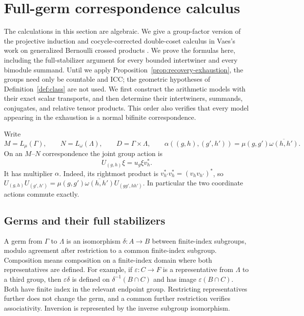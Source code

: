 \section{Full-germ correspondence calculus}\label{sec:calculus}

The calculations in this section are algebraic.  We give a group-factor
version of the projective induction and cocycle-corrected double-coset
calculus in Vaes's work on generalized Bernoulli crossed products
\cite[Theorem~2.2 and Section~6.2, especially Definition~6.8 and
Theorem~6.9]{Vaes2008}.  We prove the formulas here, including the
full-stabilizer argument for every bounded intertwiner and every bimodule
summand.  Until we apply
Proposition~\ref{prop:recovery-exhaustion}, the groups need only be countable
and ICC; the geometric hypotheses of Definition~\ref{def:class} are not
used.  We first construct the arithmetic models with their exact scalar
transports, and then determine their intertwiners, summands, conjugates,
and relative tensor products.  This order also verifies that every model
appearing in the exhaustion is a normal bifinite correspondence.

Write
\[
 M=L_\mu(\Gamma),\qquad N=L_\omega(\Lambda),\qquad
 D=\Gamma\times\Lambda,
 \qquad
 \alpha((g,h),(g',h'))=\mu(g,g')\overline{\omega(h,h')}.
\]
On an $M$--$N$ correspondence the joint group action is
\begin{equation}\label{eq:calculus-joint-action}
 U_{(g,h)}\xi=u_g\xi v_h^*.
\end{equation}
It has multiplier $\alpha$.  Indeed, its rightmost product is
$v_{h'}^*v_h^*=(v_hv_{h'})^*$, so
$U_{(g,h)}U_{(g',h')}=
\mu(g,g')\overline{\omega(h,h')}U_{(gg',hh')}$.
In particular the two coordinate actions commute exactly.

\subsection{Germs and their full stabilizers}

A germ from $\Gamma$ to $\Lambda$ is an isomorphism
$\delta:A\to B$ between finite-index subgroups, modulo agreement after
restriction to a common finite-index subgroup.  Composition means
composition on a finite-index domain where both representatives are
defined.  For example, if $\varepsilon:C\to F$ is a representative from
$\Lambda$ to a third group, then $\varepsilon\delta$ is defined on
$\delta^{-1}(B\cap C)$ and has image $\varepsilon(B\cap C)$.
Both have finite index in the relevant endpoint group.  Restricting
representatives further does not change the germ, and a common further
restriction verifies associativity.  Inversion is represented by the
inverse subgroup isomorphism.


